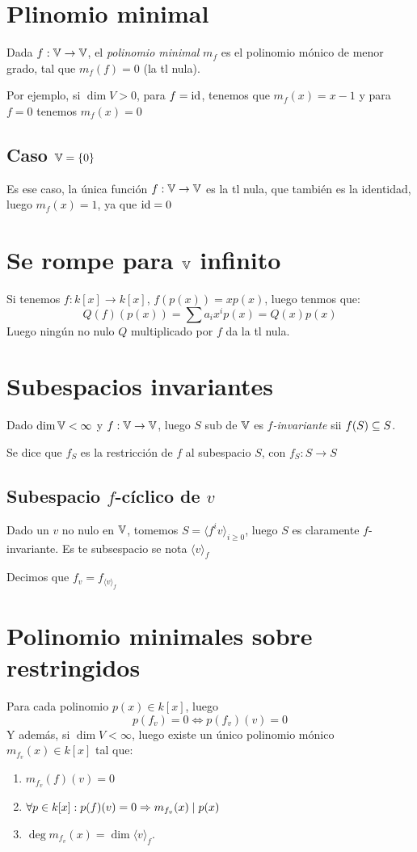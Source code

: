 \documentclass{article}
\begin{document}
\section*{Plinomio minimal}
Dada $f : \mathbb{V} \to \mathbb{V}$, el \emph{polinomio minimal} $m_f$ es el polinomio mónico de menor grado, tal que $m_f(f) = 0$ (la tl nula).

Por ejemplo, si $\dim V > 0$, para $f = \operatorname{id}$, tenemos que $m_f(x) = x-1$
y para $f = 0$ tenemos $m_f(x) = 0$

\subsection*{Caso $\mathbb{V} = \{0\}$}
Es ese caso, la única función $f : \mathbb{V} \to \mathbb{V}$ es la tl nula, que también es la identidad, luego $m_f(x) = 1$, ya que $\operatorname{id} = 0$

\section*{Se rompe para $\mathbb{V}$ infinito}
Si tenemos $f : k[x] \to k[x]$, $f(p(x)) = xp(x)$, luego tenmos que:
\[
	Q(f)(p(x)) = \sum a_i x^i p(x) = Q(x)p(x)
\]
Luego ningún no nulo $Q$ multiplicado por $f$ da la tl nula.

\section*{Subespacios invariantes}
Dado $\dim \mathbb{V} < \infty$ y $f : \mathbb{V} \to \mathbb{V}$, luego $S$ sub de $\mathbb{V}$ es \emph{$f$-invariante} sii $f(S) \subseteq S$.

Se dice que $f_S$ es la restricción de $f$ al subespacio $S$, con $f_S:S\to S$

\subsection*{Subespacio $f$-cíclico de $v$}
Dado un $v$ no nulo en $\mathbb{V}$, tomemos $S = \langle f^iv \rangle_{i \geq 0}$, luego $S$ es claramente $f$-invariante. Es te subsespacio se nota $\langle v\rangle_f$

Decimos que $f_v = f_{\langle v \rangle_f}$

\section*{Polinomio minimales sobre restringidos}
Para cada polinomio $p(x) \in k[x]$, luego
\[p(f_v) = 0 \iff p(f_v)(v) = 0\]
Y además, si $\dim V < \infty$, luego existe un único polinomio mónico $m_{f_v}(x) \in k[x]$ tal que:
\begin{enumerate}
	\item $m_{f_v}(f)(v) = 0$
	\item $\forall p \in k[x] : p(f)(v) = 0 \Rightarrow m_{f_v}(x) \mid p(x)$
	\item $\deg m_{f_v}(x) = \dim \langle v \rangle_f$.
\end{enumerate}
\end{document}
